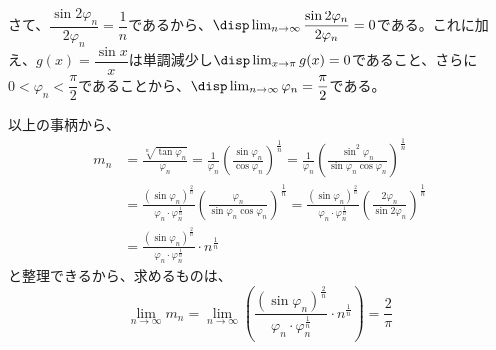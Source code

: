 さて、$\dfrac{\sin 2\varphi_n}{2\varphi_n}=\dfrac{1}{n}$であるから、$\disp \lim_{n\to\infty}\dfrac{\sin 2\varphi_n}{2\varphi_n}=0$である。これに加え、$g(x)=\dfrac{\sin x}{x}$は単調減少し$\disp \lim_{x\to \pi} g(x)=0$であること、さらに$0<\varphi_n<\dfrac{\pi}{2}$であることから、$\disp \lim_{n\to\infty} \varphi_n=\dfrac{\pi}{2}$である。

以上の事柄から、
\begin{align*}
 m_n&=\frac{\sqrt[n]{\tan\varphi_n}}{\varphi_n}=\frac{1}{\varphi_n}\left(\frac{\sin\varphi_n}{\cos\varphi_n}\right)^{\frac{1}{n}}=\frac{1}{\varphi_n}\left(\frac{\sin^2\varphi_n}{\sin\varphi_n\cos\varphi_n}\right)^{\frac{1}{n}} \\
 &=\frac{(\sin\varphi_n)^{\frac{2}{n}}}{\varphi_n\cdot\varphi_n^{\frac{1}{n}}}\left(\frac{\varphi_n}{\sin\varphi_n\cos\varphi_n}\right)^{\frac{1}{n}}=\frac{(\sin\varphi_n)^{\frac{2}{n}}}{\varphi_n\cdot\varphi_n^{\frac{1}{n}}}\left(\frac{2\varphi_n}{\sin 2\varphi_n}\right)^{\frac{1}{n}} \\
 &=\frac{(\sin\varphi_n)^{\frac{2}{n}}}{\varphi_n\cdot\varphi_n^{\frac{1}{n}}}\cdot n^{\frac{1}{n}}
\end{align*}
と整理できるから、求めるものは、
\[ \lim_{n\to\infty} m_n=\lim_{n\to\infty}\left(\frac{(\sin\varphi_n)^{\frac{2}{n}}}{\varphi_n\cdot\varphi_n^{\frac{1}{n}}}\cdot n^{\frac{1}{n}}\right) = \frac{2}{\pi} \]